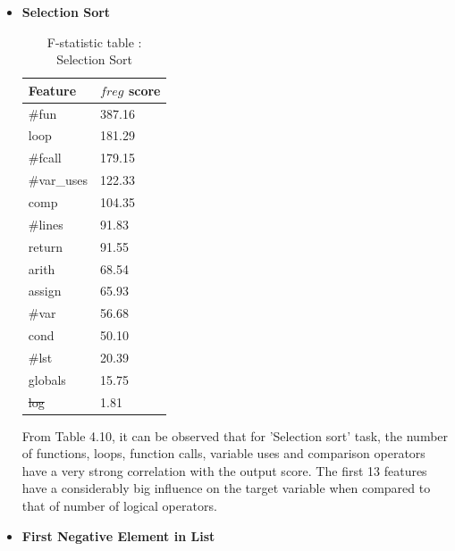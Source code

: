 \begin{itemize}
    \item \textbf{Selection Sort
}
            \begin{table}[H]
            \centering
            \caption{F-statistic table : Selection Sort}
            \begin{tabular}{|l|l|}
            \hline
            \textbf{Feature} & \textbf{$f{reg}$ score} \\ \hline
            \#fun            & 387.16                \\ \hline
            loop             & 181.29                \\ \hline
            \#fcall          & 179.15                \\ \hline
            \#var\_uses      & 122.33                \\ \hline
            comp             & 104.35                \\ \hline
            \#lines          & 91.83                 \\ \hline
            return           & 91.55                 \\ \hline
            arith            & 68.54                 \\ \hline
            assign           & 65.93                 \\ \hline
            \#var            & 56.68                 \\ \hline
            cond             & 50.10                 \\ \hline
            \#lst            & 20.39                 \\ \hline
            globals          & 15.75                 \\ \hline
            \st{log}              & 1.81                  \\ \hline
            \end{tabular}
            
            \label{ss_f}
            \end{table}
            
            From Table 4.10, it can be observed that for 'Selection sort' task, the number of functions, loops, function calls, variable uses and comparison operators have a very strong correlation with the output score. The first 13 features have a considerably big influence on the target variable when compared to that of number of logical operators. 
            
    \item \textbf{First Negative Element in List}


\end{itemize}
